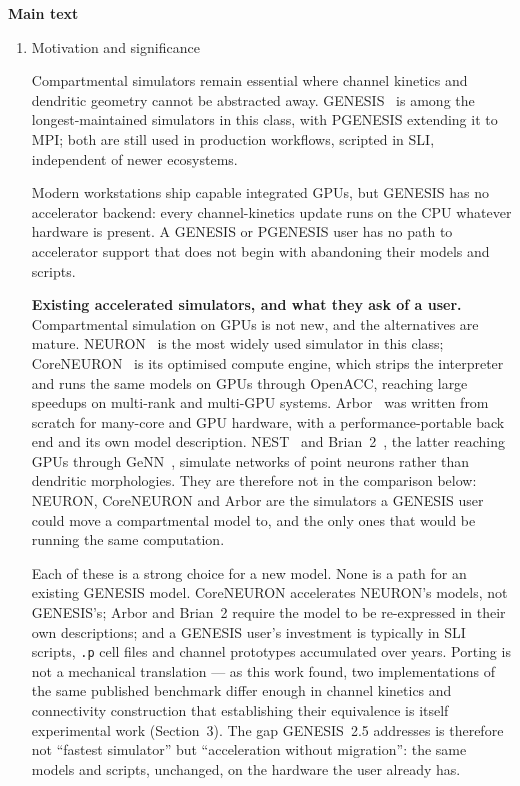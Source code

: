 \documentclass[preprint,12pt, a4paper]{elsarticle}
\begin{document}
\textbf{Main text}\\
\begin{enumerate}

\item Motivation and significance

Compartmental simulators remain essential where channel kinetics and dendritic geometry cannot be abstracted away. GENESIS~\cite{bower1998} is among the longest-maintained simulators in this class, with PGENESIS extending it to MPI; both are still used in production workflows, scripted in SLI, independent of newer ecosystems.

Modern workstations ship capable integrated GPUs, but GENESIS has no accelerator backend: every channel-kinetics update runs on the CPU whatever hardware is present. A GENESIS or PGENESIS user has no path to accelerator support that does not begin with abandoning their models and scripts.

\textbf{Existing accelerated simulators, and what they ask of a user.} Compartmental simulation on GPUs is not new, and the alternatives are mature. NEURON~\cite{hines1997neuron} is the most widely used simulator in this class; CoreNEURON~\cite{kumbhar2019coreneuron} is its optimised compute engine, which strips the interpreter and runs the same models on GPUs through OpenACC, reaching large speedups on multi-rank and multi-GPU systems. Arbor~\cite{arbor2019} was written from scratch for many-core and GPU hardware, with a performance-portable back end and its own model description. NEST~\cite{gewaltig2007nest} and Brian~2~\cite{stimberg2019brian}, the latter reaching GPUs through GeNN~\cite{yavuz2016genn}, simulate networks of point neurons rather than dendritic morphologies. They are therefore not in the comparison below: NEURON, CoreNEURON and Arbor are the simulators a GENESIS user could move a compartmental model to, and the only ones that would be running the same computation.

Each of these is a strong choice for a new model. None is a path for an existing GENESIS model. CoreNEURON accelerates NEURON's models, not GENESIS's; Arbor and Brian~2 require the model to be re-expressed in their own descriptions; and a GENESIS user's investment is typically in SLI scripts, \texttt{.p} cell files and channel prototypes accumulated over years. Porting is not a mechanical translation --- as this work found, two implementations of the same published benchmark differ enough in channel kinetics and connectivity construction that establishing their equivalence is itself experimental work (Section~3). The gap GENESIS~2.5 addresses is therefore not ``fastest simulator'' but ``acceleration without migration'': the same models and scripts, unchanged, on the hardware the user already has.


\end{enumerate}
\end{document}
